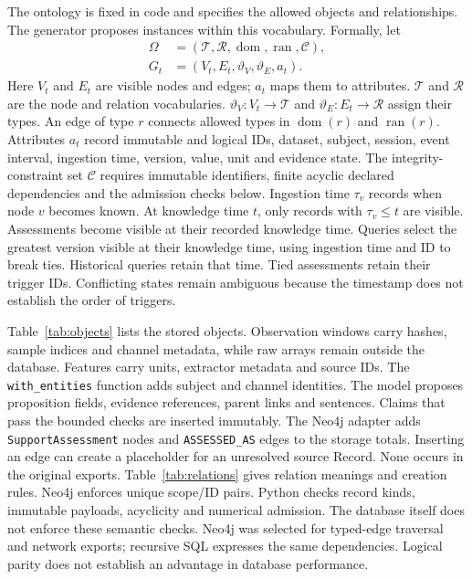 \documentclass[runningheads]{llncs}
\begin{document}
The ontology is fixed in code and specifies the allowed objects and relationships.
The generator proposes instances within this vocabulary. Formally, let
\begin{equation}
\begin{split}
 \Omega&=(\mathcal T,\mathcal R,\operatorname{dom},\operatorname{ran},\mathcal C),\\
 G_t&=(V_t,E_t,\vartheta_V,\vartheta_E,a_t).
\end{split}
\label{eq:ontology}
\end{equation}
Here $V_t$ and $E_t$ are visible nodes and edges; $a_t$ maps them to attributes.
$\mathcal T$ and $\mathcal R$ are the node and relation vocabularies.
$\vartheta_V:V_t\to\mathcal T$ and $\vartheta_E:E_t\to\mathcal R$
assign their types. An edge of type $r$ connects allowed types in
$\operatorname{dom}(r)$ and $\operatorname{ran}(r)$. Attributes $a_t$ record
immutable and logical IDs, dataset, subject, session, event interval, ingestion
time, version, value, unit and evidence state. The integrity-constraint set $\mathcal C$ requires
immutable identifiers, finite acyclic declared dependencies and the admission
checks below. Ingestion time $\tau_v$ records when node $v$ becomes known.
At knowledge time $t$, only records with $\tau_v\leq t$ are visible.
Assessments become visible at their recorded knowledge time.
Queries select the greatest version visible at their knowledge time,
using ingestion time and ID to break ties. Historical queries retain that time. Tied assessments retain their trigger IDs. Conflicting states
remain ambiguous because the timestamp does not establish the order of triggers.

Table~\ref{tab:objects} lists the stored objects. Observation windows carry hashes,
sample indices and channel metadata, while raw arrays remain outside the database.
Features carry units, extractor metadata and source IDs. The
\texttt{with\_entities} function adds subject and channel identities.
The model proposes proposition fields, evidence references, parent links and
sentences. Claims that pass the bounded checks are inserted immutably.
The Neo4j adapter adds \texttt{SupportAssessment} nodes and
\texttt{ASSESSED\_AS} edges to the storage totals.
Inserting an edge can create a placeholder for an unresolved source Record.
None occurs in the original exports. Table~\ref{tab:relations} gives relation
meanings and creation rules. Neo4j enforces unique scope/ID pairs.
Python checks record kinds, immutable payloads, acyclicity and numerical
admission. The database itself does not enforce these semantic checks.
Neo4j was selected for typed-edge traversal and network exports; recursive
SQL expresses the same dependencies. Logical parity does not establish
an advantage in database performance.
\end{document}
